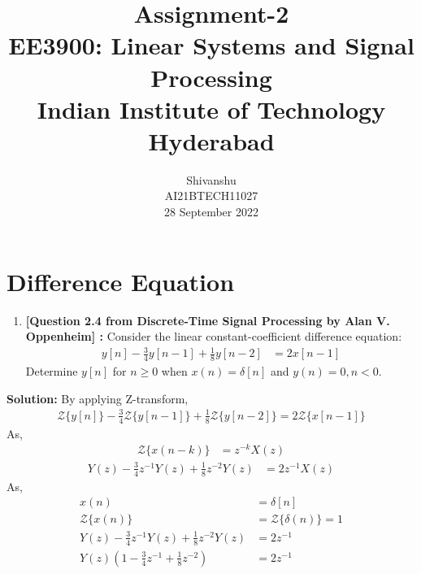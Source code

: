 \documentclass[journal,12pt,twocolumn]{IEEEtran}
\newcommand{\solution}{\noindent \textbf{Solution: }}
\providecommand{\brak}[1]{\ensuremath{\left(#1\right)}}
\providecommand{\sbrak}[1]{\ensuremath{\left[#1\right]}}
\numberwithin{equation}{section}
\renewcommand\thesection{\arabic{section}}
\begin{document}
\title{ Assignment-2 \\ \Large EE3900: Linear Systems and Signal Processing \\ \large Indian Institute of Technology Hyderabad}
\author{Shivanshu \\ \normalsize AI21BTECH11027 \\ \vspace*{20pt} \normalsize 28 September 2022}
\maketitle

\section{Difference Equation}
\begin{enumerate}[label=\thesection.\arabic*]
    \item \textbf{[Question 2.4 from Discrete-Time Signal Processing by Alan V. Oppenheim] : }Consider the linear constant-coefficient difference equation:
          \begin{align}
              y\sbrak{n}-\frac{3}{4}y\sbrak{n-1}+\frac{1}{8}y\sbrak{n-2} & =2x\sbrak{n-1}
          \end{align}
          Determine $y\sbrak{n}$ for $n\ge 0 $ when $x\brak{n}=\delta \sbrak{n}$ and $y\brak{n}=0,n<0$.
\end{enumerate}
\solution By applying Z-transform,
\begin{align}
    {\mathcal {Z}}\{y\sbrak{n}\}-\frac{3}{4}{\mathcal {Z}}\{y\sbrak{n-1}\}+\frac{1}{8}{\mathcal {Z}}\{y\sbrak{n-2}\}=2{\mathcal {Z}}\{x\sbrak{n-1}\}
\end{align}
As,
\begin{align}
    \label{eq:z-trans-prop}
    {\mathcal {Z}}\{x(n-k)\} & = z^{-k}X(z)
\end{align}
\begin{align}
    Y(z)-\frac{3}{4}z^{-1}Y(z)+\frac{1}{8}z^{-2}Y(z) & =2z^{-1}X(z)
\end{align}
As,
\begin{align}
    x\brak{n}                                        & =\delta \sbrak{n}              \\
    {\mathcal {Z}}\{x(n)\}                           & ={\mathcal {Z}}\{\delta(n)\}=1 \\
    Y(z)-\frac{3}{4}z^{-1}Y(z)+\frac{1}{8}z^{-2}Y(z) & =2z^{-1}                       \\
    Y(z)(1-\frac{3}{4}z^{-1}+\frac{1}{8}z^{-2})      & =2z^{-1}
\end{align}
\end{document}
